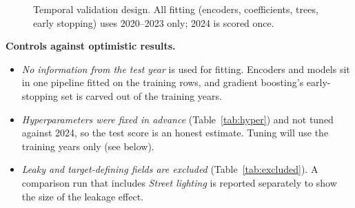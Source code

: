 \documentclass[11pt,a4paper]{article}
\begin{document}
\begin{figure}[H]
\centering
{}
\caption{Temporal validation design. All fitting (encoders, coefficients, trees, early stopping) uses 2020--2023 only; 2024 is scored once.}
\label{fig:split}
\end{figure}

\textbf{Controls against optimistic results.}
\begin{itemize}
  \item \emph{No information from the test year} is used for fitting. Encoders and models sit in one pipeline fitted
        on the training rows, and gradient boosting's early-stopping set is carved out of the training years.
  \item \emph{Hyperparameters were fixed in advance} (Table~\ref{tab:hyper}) and not tuned against 2024, so the test score
        is an honest estimate. Tuning will use the training years only (see below).
  \item \emph{Leaky and target-defining fields are excluded} (Table~\ref{tab:excluded}). A comparison run that includes
        \emph{Street lighting} is reported separately to show the size of the leakage effect.
\end{itemize}
\end{document}
